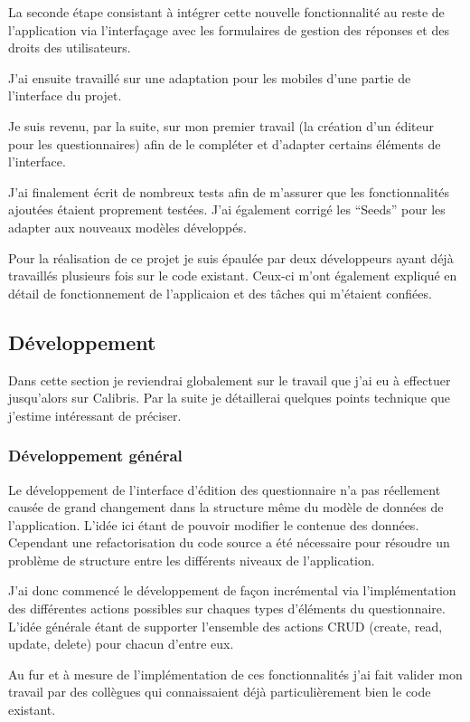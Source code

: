 \documentclass[12pt,a4paper]{book}
\begin{document}
La seconde étape consistant à intégrer cette nouvelle fonctionnalité au reste de l'application via l'interfaçage avec les formulaires de gestion des réponses et des droits des utilisateurs.

J'ai ensuite travaillé sur une adaptation pour les mobiles d'une partie de l'interface du projet.

Je suis revenu, par la suite, sur mon premier travail (la création d'un éditeur pour les questionnaires) afin de le compléter et d'adapter certains éléments de l'interface.

J'ai finalement écrit de nombreux tests afin de m'assurer que les fonctionnalités ajoutées étaient proprement testées. J'ai également corrigé les ``Seeds'' pour les adapter aux nouveaux modèles développés.

Pour la réalisation de ce projet je suis épaulée par deux développeurs ayant déjà travaillés plusieurs fois sur le code existant. Ceux-ci m'ont également expliqué en détail de fonctionnement de l'applicaion et des tâches qui m'étaient confiées.

\subsection{Développement}

Dans cette section je reviendrai globalement sur le travail que j'ai eu à effectuer jusqu'alors sur Calibris. Par la suite je détaillerai quelques points technique que j'estime intéressant de préciser.

\subsubsection{Développement général}

Le développement de l'interface d'édition des questionnaire n'a pas réellement causée de grand changement dans la structure même du modèle de données de l'application. L'idée ici étant de pouvoir modifier le contenue des données. Cependant une refactorisation du code source a été nécessaire pour résoudre un problème de structure entre les différents niveaux de l'application.

J'ai donc commencé le développement de façon incrémental via l'implémentation des différentes actions possibles sur chaques types d'éléments du questionnaire. L'idée générale étant de supporter l'ensemble des actions CRUD (create, read, update, delete) pour chacun d'entre eux.

Au fur et à mesure de l'implémentation de ces fonctionnalités j'ai fait valider mon travail par des collègues qui connaissaient déjà particulièrement bien le code existant.
\end{document}
